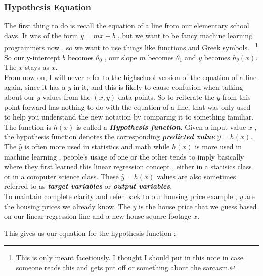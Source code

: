 \subsubsectionend
\subsubsection{Hypothesis Equation}
\label{sssec:equation}

The first thing to do is recall the equation of a line from our elementary
school days. It was of the form \( y=mx+b \) , but we want to be fancy machine
learning programmers now , so we want to use things like functions and Greek
symbols.  ~\footnote{This is only meant facetiously. I thought I should put in
	this note in case someone reads this and gets put off or something about
	the sarcasm.  } So our y-intercept \( b \) becomes \( \theta_{0} \) , our
slope \( m \) becomes \( \theta_{1} \) and \( y \) becomes \( h_{\theta}(x) \).
The \( x \) stays as \( x \).\\

From now on, I will never refer to the highschool version of the equation of a
line again, since it has a \( y \) in it, and this is likely to cause
confusion when talking about our \( y \) values from the \( (x,y) \) data
points. So to reiterate the \( y \) from this point forward has nothing to do
with the equation of a line, that was only used to help you understand the new
notation by comparing it to something familiar.\\

The function is \( h(x) \) is called a \textbf{\textit{Hypothesis function}}.
Given a input value \( x \) , the hypothesis function denotes the corresponding
\textbf{\textit{predicted value}} \( \hat{y} = h(x) \). The \( \hat{y} \) is
often more used in statistics and math while \( h(x) \) is more used in machine
learning , people's usage of one or the other tends to imply basically where
they first learned this linear regression concept , either in a statisics class
or in a computer science class. These \( \hat{y} = h(x) \) values are also
sometimes referred to as \textbf{\textit{target variables}} or
\textbf{\textit{output variables}}.  \\

To maintain complete clarity and refer back to our housing price example
, \( y \) are the housing prices we already know. The \( \hat{y} \) is the
house price that we guess based on our linear regression line and a new house
square footage \( x \).

This gives us our equation for the hypothesis function :

